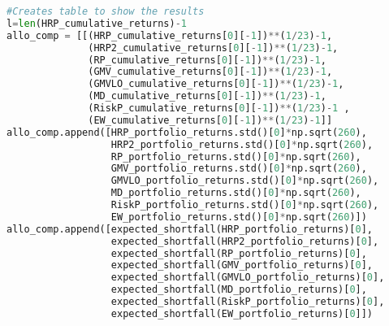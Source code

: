 \begin{lstlisting}[language=Python]
#Creates table to show the results
l=len(HRP_cumulative_returns)-1
allo_comp = [[(HRP_cumulative_returns[0][-1])**(1/23)-1,
              (HRP2_cumulative_returns[0][-1])**(1/23)-1, 
              (RP_cumulative_returns[0][-1])**(1/23)-1,
              (GMV_cumulative_returns[0][-1])**(1/23)-1, 
              (GMVLO_cumulative_returns[0][-1])**(1/23)-1,
              (MD_cumulative_returns[0][-1])**(1/23)-1,
              (RiskP_cumulative_returns[0][-1])**(1/23)-1 ,
              (EW_cumulative_returns[0][-1])**(1/23)-1]]
allo_comp.append([HRP_portfolio_returns.std()[0]*np.sqrt(260),
                  HRP2_portfolio_returns.std()[0]*np.sqrt(260),
                  RP_portfolio_returns.std()[0]*np.sqrt(260), 
                  GMV_portfolio_returns.std()[0]*np.sqrt(260), 
                  GMVLO_portfolio_returns.std()[0]*np.sqrt(260),
                  MD_portfolio_returns.std()[0]*np.sqrt(260),
                  RiskP_portfolio_returns.std()[0]*np.sqrt(260),
                  EW_portfolio_returns.std()[0]*np.sqrt(260)])
allo_comp.append([expected_shortfall(HRP_portfolio_returns)[0],
                  expected_shortfall(HRP2_portfolio_returns)[0],
                  expected_shortfall(RP_portfolio_returns)[0], 
                  expected_shortfall(GMV_portfolio_returns)[0], 
                  expected_shortfall(GMVLO_portfolio_returns)[0], 
                  expected_shortfall(MD_portfolio_returns)[0],
                  expected_shortfall(RiskP_portfolio_returns)[0], 
                  expected_shortfall(EW_portfolio_returns)[0]])
\end{lstlisting}

